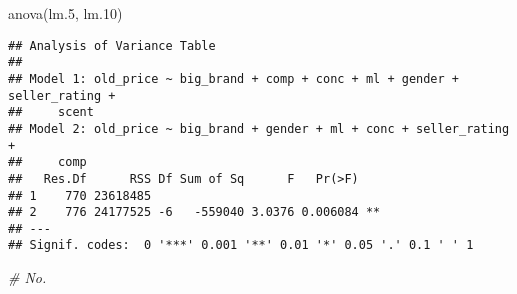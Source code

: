 \documentclass[
]{article}
\newenvironment{Shaded}{\begin{snugshade}}{\end{snugshade}}
\newcommand{\CommentTok}[1]{\textcolor[rgb]{0.56,0.35,0.01}{\textit{#1}}}
\newcommand{\FloatTok}[1]{\textcolor[rgb]{0.00,0.00,0.81}{#1}}
\newcommand{\FunctionTok}[1]{\textcolor[rgb]{0.00,0.00,0.00}{#1}}
\newcommand{\NormalTok}[1]{#1}
\begin{document}
\begin{Shaded}
\begin{Highlighting}[]
\FunctionTok{anova}\NormalTok{(lm}\FloatTok{.5}\NormalTok{, lm}\FloatTok{.10}\NormalTok{)}
\end{Highlighting}
\end{Shaded}

\begin{verbatim}
## Analysis of Variance Table
## 
## Model 1: old_price ~ big_brand + comp + conc + ml + gender + seller_rating + 
##     scent
## Model 2: old_price ~ big_brand + gender + ml + conc + seller_rating + 
##     comp
##   Res.Df      RSS Df Sum of Sq      F   Pr(>F)   
## 1    770 23618485                                
## 2    776 24177525 -6   -559040 3.0376 0.006084 **
## ---
## Signif. codes:  0 '***' 0.001 '**' 0.01 '*' 0.05 '.' 0.1 ' ' 1
\end{verbatim}

\begin{Shaded}
\begin{Highlighting}[]
\CommentTok{\# No.}
\end{Highlighting}
\end{Shaded}
\end{document}
